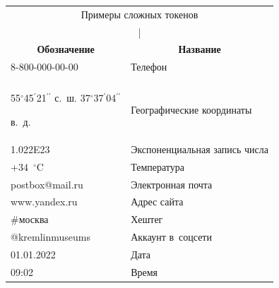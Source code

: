   \begin{table}[b]\small


\begin{center}


\begin{tabular}{|l|l|}


\multicolumn{2}{c}{Примеры сложных токенов}\\


\multicolumn{2}{c}{| }\\[-6pt]


\hline


\multicolumn{1}{|c|}{\textbf{Обозначение}}&\multicolumn{1}{c|}{\textbf{Название}}\\


\hline


8-800-000-00-00&Телефон\\


\hline


&\\[-9pt]


55$^\circ$45$^\prime$21$^{\prime\prime}$ с.~ш. 37$^\circ$37$^\prime$04$^{\prime\prime}$ 


в.~д.&Географические координаты\\


\hline


1.022E23&Экспоненциальная запись числа\\


\hline


$+34$~$^\circ$C&Температура\\


\hline


postbox@mail.ru&Электронная почта\\


\hline


{\sf www.yandex.ru}&Адрес сайта\\


\hline


\#москва&Хештег\\


\hline


@kremlinmuseums&Аккаунт в~соцсети\\


\hline


01.01.2022&Дата\\


\hline


09:02&Время\\


\hline



\end{tabular}
\end{center}
\end{table}

